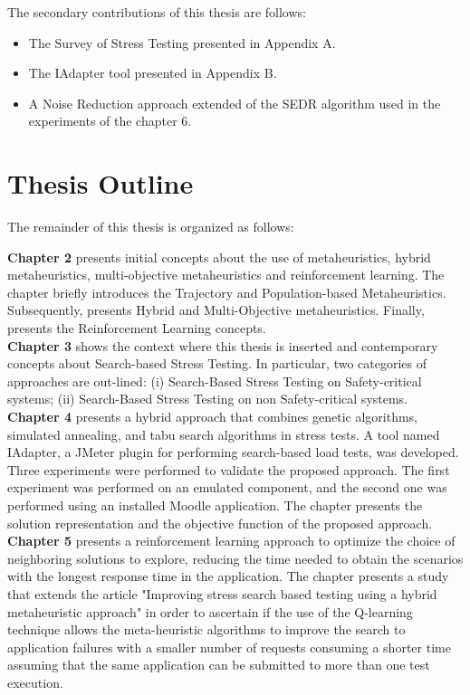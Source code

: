 \documentclass[espaco=umemeio,chapter=TITLE,twoside,openright]{abnt}
\begin{document}
The secondary contributions of this thesis are follows:

\begin{itemize}
\item The Survey of Stress Testing presented in Appendix A.
\item The IAdapter tool presented in Appendix B.
\item A Noise Reduction approach extended of the SEDR algorithm used in the experiments of the chapter 6.
\end{itemize}



\section{Thesis Outline}

The remainder of this thesis is organized as follows:

\textbf{Chapter 2} presents initial concepts about the use of metaheuristics, hybrid metaheuristics, multi-objective metaheuristics and reinforcement learning. The chapter briefly introduces the Trajectory and Population-based Metaheuristics.  Subsequently, presents Hybrid and Multi-Objective metaheuristics. Finally, presents the Reinforcement Learning concepts. 
\\

\textbf{Chapter 3} shows the context where this thesis is inserted and contemporary concepts about Search-based Stress Testing. In particular, two categories of approaches are out-lined: (i) Search-Based Stress Testing on Safety-critical systems; (ii) Search-Based Stress Testing on non Safety-critical systems.
\\

\textbf{Chapter 4} presents a hybrid approach that combines genetic algorithms, simulated annealing, and tabu search algorithms in stress tests. A tool named IAdapter, a JMeter plugin for performing search-based load tests, was developed. Three experiments  were performed to validate the proposed approach. The first experiment was performed on an emulated component, and the second one was performed using an installed Moodle application. The chapter presents the solution representation and the objective function of the proposed approach.
\\

\textbf{Chapter 5} presents a reinforcement learning approach to optimize the choice of neighboring solutions to explore, reducing the time needed to obtain the scenarios with the longest response time in the application. The chapter presents a study that extends the article "Improving stress search based testing using a hybrid metaheuristic approach"  in order to ascertain if the use of the Q-learning technique allows the meta-heuristic algorithms to improve the search to application failures with a smaller number of requests consuming a shorter time assuming that the same application can be submitted to more than one test execution.
\\
\end{document}
